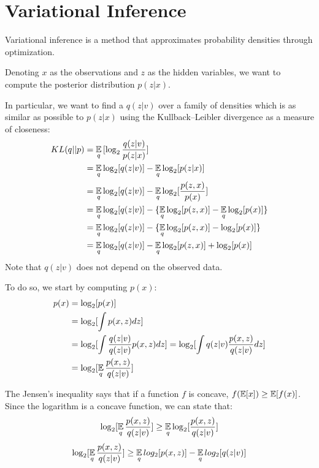 \chapter{Variational Inference} \label{vi}
Variational inference is a method that approximates probability densities through optimization.

Denoting $x$ as the observations and $z$ as the hidden variables,
we want to compute the posterior distribution $p(z | x)$.

In particular, we want to find a $q(z | v)$ over a family of densities
which is as similar as possible to $p(z | x)$ using the Kullback–Leibler divergence as a measure of closeness:
\begin{equation} \label{eq:klexpanded}
    \begin{split}
        KL(q || p) & = \operatorname*{\mathbb{E}}_q {[\log_2 \frac{q(z | v)}{p(z | x)}]} \\
        & = \operatorname*{\mathbb{E}}_q \log_2 [q(z | v)] - \operatorname*{\mathbb{E}}_q \log_2 [p(z | x)] \\
        & = \operatorname*{\mathbb{E}}_q \log_2 [q(z | v)] - \operatorname*{\mathbb{E}}_q \log_2 [\frac{p(z,x)}{p(x)}] \\
        & = \operatorname*{\mathbb{E}}_q \log_2 [q(z | v)] - \{ \operatorname*{\mathbb{E}}_q \log_2 [p(z,x)] - \operatorname*{\mathbb{E}}_q \log_2 [p(x)] \} \\
        & = \operatorname*{\mathbb{E}}_q \log_2 [q(z | v)] - \{ \operatorname*{\mathbb{E}}_q \log_2 [p(z,x)] - \log_2 [p(x)] \} \\
        & = \operatorname*{\mathbb{E}}_q \log_2 [q(z | v)] - \operatorname*{\mathbb{E}}_q \log_2 [p(z,x)] + \log_2 [p(x)]
    \end{split}
\end{equation}
Note that $q(z | v)$ does not depend on the observed data.

To do so, we start by computing $p(x)$:
\begin{equation*}
    \begin{split}
        p(x) & = \log_2[p(x)] \\
        & = \log_2[\int p(x,z) dz]  \\
        & = \log_2[\int \frac{q(z | v)}{q(z | v)} p(x,z) dz] = \log_2[\int q(z | v) \frac{p(x,z)}{q(z | v)} dz] \\
        & = \log_2[\operatorname*{\mathbb{E}}_q \frac{p(x,z)}{q(z | v)}]
    \end{split}
\end{equation*}

The Jensen's inequality says that if a function $f$ is concave, $f(\operatorname*{\mathbb{E}}[x]) \geq \operatorname*{\mathbb{E}}[f(x)]$.
Since the logarithm is a concave function, we can state that:
$$ \log_2[\operatorname*{\mathbb{E}}_q \frac{p(x,z)}{q(z | v)}] \geq \operatorname*{\mathbb{E}}_q \log_2[\frac{p(x,z)}{q(z | v)}] $$
$$ \log_2[\operatorname*{\mathbb{E}}_q \frac{p(x,z)}{q(z | v)}] \geq \operatorname*{\mathbb{E}}_q log_2[p(x,z)] - \operatorname*{\mathbb{E}}_q log_2[q(z | v)] $$


